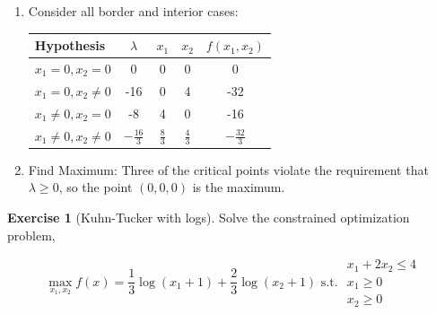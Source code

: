 \documentclass[
]{book}
\providecommand{\tightlist}{%
  \setlength{\itemsep}{0pt}\setlength{\parskip}{0pt}}
\theoremstyle{definition}
\theoremstyle{definition}
\theoremstyle{definition}
\newtheorem{exercise}{Exercise}[chapter]
\theoremstyle{remark}
\begin{document}
\begin{enumerate}
\def\labelenumi{\arabic{enumi}.}
\setcounter{enumi}{2}
\tightlist
\item
  Consider all border and interior cases:

  \begin{center}
  \begin{tabular}{|l|ccc|c|}
  \hline
  Hypothesis  & $\lambda$& $x_1$ & $x_2$ & $f(x_1, x_2)$\\
  \hline
  $x_1 = 0, x_2 = 0$  &0 & 0 & 0 & 0\\
  $x_1 = 0, x_2 \neq 0$  &-16 & 0 & 4 & -32\\
  $x_1 \neq 0, x_2 = 0$  &-8 & 4 & 0 & -16\\
  $x_1 \neq 0, x_2 \neq 0$ & $-\frac{16}{3}$ & $\frac{8}{3}$ & $\frac{4}{3}$ & $-\frac{32}{3}$\\
  \hline
  \end{tabular}
  \end{center}
\item
  Find Maximum:
  Three of the critical points violate the requirement that \(\lambda \geq 0\), so the point \((0,0,0)\) is the maximum.
\end{enumerate}

\begin{exercise}[Kuhn-Tucker with logs]
\protect\hypertarget{exr:unnamed-chunk-64}{}{\label{exr:unnamed-chunk-64} {} }Solve the constrained optimization problem,

\[\max_{x_1,x_2} f(x) = \frac{1}{3}\log (x_1 + 1) + \frac{2}{3}\log (x_2 + 1) \text{ s.t. }  
\begin{array}{l}
x_1 + 2x_2 \leq 4\\
     x_1 \geq 0\\
    x_2 \geq 0
\end{array}\]
\end{exercise}
\end{document}

